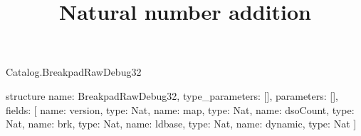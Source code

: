\begin{lexlean}{Catalog.BreakpadRawDebug32}
\title{Natural number addition}
\begin{semanticmodule}
structure{
  name: BreakpadRawDebug32,
  type_parameters: [],
  parameters: [],
  fields: [
    {name: version, type: Nat},
    {name: map, type: Nat},
    {name: dsoCount, type: Nat},
    {name: brk, type: Nat},
    {name: ldbase, type: Nat},
    {name: dynamic, type: Nat}
  ]
}
\end{semanticmodule}
\end{lexlean}
